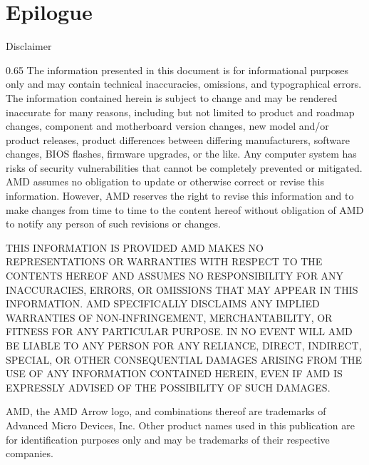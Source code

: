 \appendix
\section*{Epilogue}

\setcounter{lastslidenum}{\theframenumber}

\begin{frame}{Disclaimer}
\begin{scalepar}{0.65}
The information presented in this document is for informational purposes only and may contain technical 
inaccuracies, omissions, and typographical errors. The information contained herein is subject to change 
and may be rendered inaccurate for many reasons, including but not limited to product and roadmap 
changes, component and motherboard version changes, new model and/or product releases, product 
differences between differing manufacturers, software changes, BIOS flashes, firmware upgrades, or the 
like. Any computer system has risks of security vulnerabilities that cannot be completely prevented or 
mitigated. AMD assumes no obligation to update or otherwise correct or revise this information. 
However, AMD reserves the right to revise this information and to make changes from time to time to 
the content hereof without obligation of AMD to notify any person of such revisions or changes.

\medskip

THIS INFORMATION IS PROVIDED  AMD MAKES NO REPRESENTATIONS OR WARRANTIES WITH 
RESPECT TO THE CONTENTS HEREOF AND ASSUMES NO RESPONSIBILITY FOR ANY INACCURACIES, 
ERRORS, OR OMISSIONS THAT MAY APPEAR IN THIS INFORMATION. AMD SPECIFICALLY DISCLAIMS ANY 
IMPLIED WARRANTIES OF NON-INFRINGEMENT, MERCHANTABILITY, OR FITNESS FOR ANY PARTICULAR 
PURPOSE. IN NO EVENT WILL AMD BE LIABLE TO ANY PERSON FOR ANY RELIANCE, DIRECT, INDIRECT, 
SPECIAL, OR OTHER CONSEQUENTIAL DAMAGES ARISING FROM THE USE OF ANY INFORMATION 
CONTAINED HEREIN, EVEN IF AMD IS EXPRESSLY ADVISED OF THE POSSIBILITY OF SUCH DAMAGES.

\medskip

AMD, the AMD Arrow logo, and combinations thereof are trademarks of Advanced Micro Devices, Inc. Other product 
names used in this publication are for identification purposes only and may be trademarks of their 
respective companies. 


\end{scalepar}
\end{frame}
